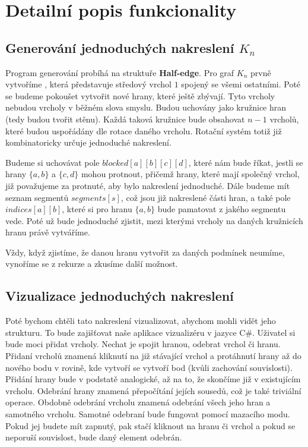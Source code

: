 \documentclass{article}
\begin{document}
\section{Detailní popis funkcionality}

\subsection{Generování jednoduchých nakreslení $K_n$}

Program generování probíhá na struktuře \textbf{Half-edge}. Pro graf $K_n$ prvně vytvoříme , která představuje středový vrchol $1$ spojený se všemi ostatní\-mi. Poté se budeme pokoušet vytvořit nové hrany, které ještě zbývají.
Tyto vrcholy nebudou vrcholy v běžném slova smyslu. Budou uchovány jako kružnice hran (tedy budou tvořit  stěnu). Každá taková kružnice bude obsahovat $n-1$ vrcholů, které budou uspořádány dle rotace daného vrcholu. Rotační systém totiž již kombinatoricky určuje jednoduché nakreslení.

Budeme si uchovávat pole $blocked[a][b][c][d]$, které nám bude říkat, jestli se hrany $\{a, b\}$ a $\{c, d\}$ mohou protnout, přičemž hrany, které mají společný vrchol, již považujeme za protnuté, aby bylo nakreslení jednoduché. Dále budeme mít seznam segmentů $segments[s]$, což jsou již nakreslené části hran, a také pole $indices[a][b]$, které si pro hranu $\{a, b\}$ bude pamatovat z jakého segmentu vede. Poté už bude jednoduché zjistit, mezi kterými vrcholy na daných kružnicích hranu právě vytváříme.

Vždy, když zjistíme, že danou hranu vytvořit za daných podmínek neumíme, vynoříme se z rekurze a zkusíme další možnost.

\subsection{Vizualizace jednoduchých nakreslení}

Poté bychom chtěli tato nakreslení vizualizovat, abychom mohli vidět jeho strukturu. To bude zajišťovat naše aplikace vizualizéru v jazyce C\#. Uživatel si bude moci přidat vrcholy. Nechat je spojit hranou, odebrat vrchol či hranu. 
Přidaní vrcholů znamená kliknutí na již stávající vrchol a protáhnutí hrany až do nového bodu v rovině, kde vytvoří se vytvoří bod (kvůli zachování souvislosti). Přidání hrany bude v podstatě analogické, až na to, že skončíme již v existujícím vrcholu. Odebrání hrany znamená přepočítání jejích sousedů, což je také triviální operace. Obdobně odebrání vrcholu znamená odebrání všech jeho hran a samotného vrcholu.
Samotné odebraní bude fungovat pomocí mazacího modu. Pokud jej budete mít zapnutý, pak stačí kliknout na hranu či vrchol a pokud se neporuší souvislost, bude daný element odebrán.
\end{document}
